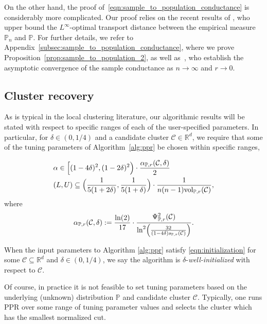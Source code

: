 \documentclass[11pt,twoside]{article}
\newcommand{\Reals}{\mathbb{R}}
\newcommand{\1}{\mathbf{1}}
\newcommand{\Rd}{\Reals^d}
\newcommand{\Leb}{L}
\newcommand{\mc}[1]{\mathcal{#1}}
\newcommand{\Pbb}{\mathbb{P}}
\newcommand{\vol}{\mathrm{vol}}
\begin{document}
On the other hand, the proof of~\eqref{eqn:sample_to_population_conductance} is considerably more complicated. Our proof relies on the recent results of \citet{garciatrillos16b}, who upper bound the  $\Leb^{\infty}$-optimal transport distance between the empirical measure $\Pbb_n$ and $\Pbb$. For further details, we refer to Appendix~\ref{subsec:sample_to_population_conductance}, where we prove Proposition~\ref{prop:sample_to_population_2}, as well as~\citet{garciatrillos16}, who establish the asymptotic convergence of the sample conductance as $n \to \infty$ and $r \to 0$.

\subsection{Cluster recovery}
\label{subsec:cluster_recovery}
As is typical in the local clustering literature, our algorithmic results will be stated with respect to specific ranges of each of the user-specified
parameters. In particular, for $\delta \in (0,1/4)$ and a candidate cluster $\mc{C} \in \Rd$, we require that some of the tuning parameters of Algorithm~\ref{alg:ppr} be chosen within specific ranges, 

\begin{equation}
\label{eqn:initialization}
\begin{aligned}
& \alpha \in \Bigl[(1 - 4\delta)^2, (1 - 2\delta)^2\Bigr) \cdot
 \frac{\alpha_{\Pbb,r}(\mc{C},\delta)}{2} \\
& (L,U) \subseteq \Bigl(\frac{1}{5(1 + 2\delta)},\frac{1}{5(1 + \delta)}\Bigr) \cdot 
\frac{1}{n(n - 1)\vol_{\Pbb,r}(\mc{C})},
\end{aligned}  
\end{equation}
where
\begin{equation}
\label{eqn:alpha_initialization}
\alpha_{\Pbb,r}(\mc{C},\delta) := \frac{\ln(2)}{17} \cdot \frac{\Psi_{\Pbb,r}^2(\mc{C})}{\ln^2\Bigl(\frac{32}{(1 - 4\delta)s_{\Pbb,r}(\mc{C})}\Bigr)}.
\end{equation}

\begin{definition}
	When the input parameters to Algorithm \ref{alg:ppr} satisfy \eqref{eqn:initialization} for some $\mc{C} \subseteq \Rd$ and $\delta \in (0,1/4)$, we say the algorithm is $\delta$-\emph{well-initialized} with respect to $\mc{C}$.
\end{definition}

Of course, in practice it is not feasible to set tuning parameters based on the underlying (unknown) distribution $\Pbb$ and candidate cluster $\mc{C}$. Typically, one runs PPR over some range of tuning parameter values and selects the cluster which has the smallest normalized cut. 
\end{document}
